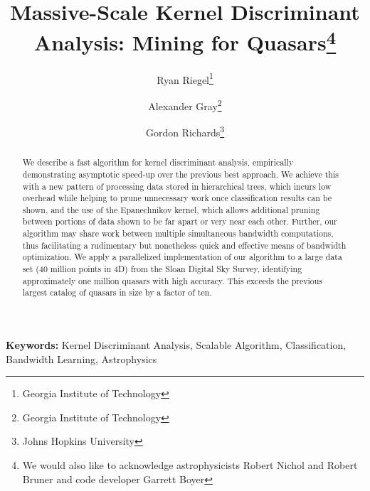 \documentclass[twoside,leqno,twocolumn]{article}
\begin{document}

\title{\Large Massive-Scale Kernel Discriminant Analysis: Mining for Quasars\thanks{We would also like to acknowledge astrophysicists Robert Nichol and Robert Bruner and code developer Garrett Boyer}}
\author{Ryan Riegel\thanks{Georgia Institute of Technology} \\
  \and Alexander Gray\thanks{Georgia Institute of Technology} \\
  \and Gordon Richards\thanks{Johns Hopkins University}}
\date{}

\maketitle


\begin{abstract} \small\baselineskip=9pt
  We describe a fast algorithm for kernel discriminant analysis,
  empirically demonstrating asymptotic speed-up over the previous best
  approach.  We achieve this with a new pattern of processing data
  stored in hierarchical trees, which incurs low overhead while
  helping to prune unnecessary work once classification results can be
  shown, and the use of the Epanechnikov kernel, which allows
  additional pruning between portions of data shown to be far apart or
  very near each other.  Further, our algorithm may share work between
  multiple simultaneous bandwidth computations, thus facilitating a
  rudimentary but nonetheless quick and effective means of bandwidth
  optimization.  We apply a parallelized implementation of our
  algorithm to a large data set (40 million points in 4D) from the
  Sloan Digital Sky Survey, identifying approximately one million
  quasars with high accuracy.  This exceeds the previous largest
  catalog of quasars in size by a factor of ten.
\end{abstract}

{\bf Keywords:} Kernel Discriminant Analysis, Scalable Algorithm, Classification, Bandwidth Learning, Astrophysics
\end{document}
